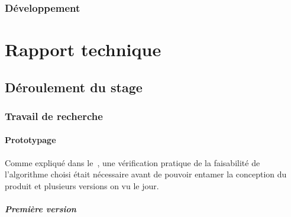 \documentclass[a4paper,10pt, twoside]{report}
\begin{document}
\begin{spacing}{1.2}
\subsection{D\'eveloppement}


\chapter{Rapport technique}
\thispagestyle{fancy}
\label{rapportTechnique}
\section{D\'eroulement du stage}
\subsection{Travail de recherche}
\subsubsection{Prototypage}
Comme expliqu\'e dans le~, une v\'erification pratique
de la faisabilit\'e de l'algorithme choisi \'etait n\'ecessaire avant de
pouvoir entamer la conception du produit et plusieurs versions on vu le jour.

\paragraph{Premi\`ere version}



\newpage
\listoffigures
\listoftables



\end{spacing}
\end{document}
